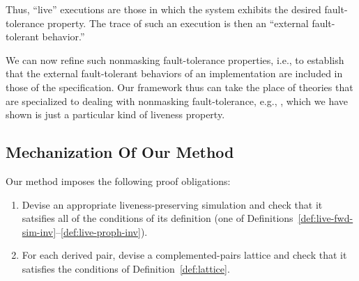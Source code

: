 \documentclass[11pt]{article}
\newcommand{\bn}{\begin{enumerate}}
\newcommand{\en}{\end{enumerate}}
\begin{document}

Thus, ``live'' executions are those in which the system exhibits the
desired fault-tolerance property.  The trace of such an execution is
then an ``external fault-tolerant behavior.''

We can now refine such nonmasking fault-tolerance properties, i.e., to
establish that the external fault-tolerant behaviors of an
implementation are included in those of the specification.  Our
framework thus can take the place of theories that are specialized to
dealing with nonmasking fault-tolerance, e.g., \cite{DA02},
which we have shown is just a particular kind of liveness property.


 
\subsection{Mechanization Of Our Method}
\label{sec:mechanization}

Our method imposes the following proof obligations:
\bn

\item Devise an appropriate liveness-preserving simulation and check
that it satsifies all of the conditions of its definition
(one of Definitions~\ref{def:live-fwd-sim-inv}--\ref{def:live-proph-inv}).

\item For each derived pair, devise a complemented-pairs lattice and check
  that it satisfies the conditions of Definition~\ref{def:lattice}.

\en
\end{document}

